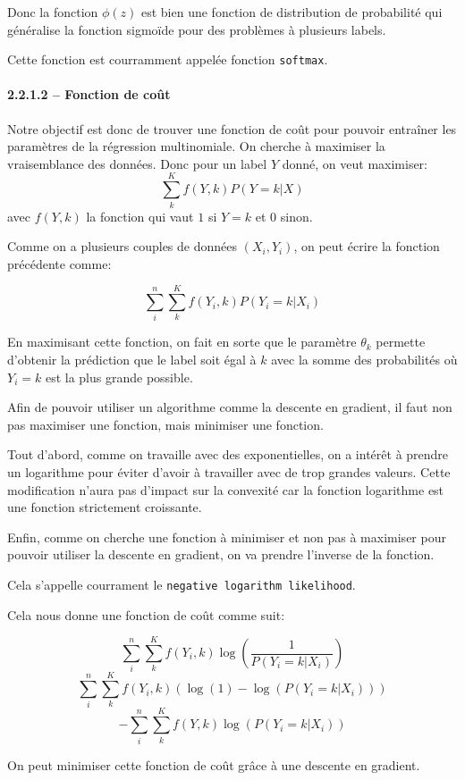 \documentclass[
]{article}
\begin{document}
Donc la fonction \(\phi(z)\) est bien une fonction de distribution de
probabilité qui généralise la fonction sigmoïde pour des problèmes à
plusieurs labels.

Cette fonction est courramment appelée fonction \texttt{softmax}.

\paragraph{2.2.1.2 -- Fonction de coût}\label{fonction-de-couxfbt}

Notre objectif est donc de trouver une fonction de coût pour pouvoir
entraîner les paramètres de la régression multinomiale. On cherche à
maximiser la vraisemblance des données. Donc pour un label \(Y\) donné,
on veut maximiser: \[\sum_k^K f(Y, k) P(Y = k | X)\] avec \(f(Y, k)\) la
fonction qui vaut \(1\) si \(Y = k\) et \(0\) sinon.

Comme on a plusieurs couples de données \((X_i, Y_i)\), on peut écrire
la fonction précédente comme:

\[\sum_i^n\sum_k^K f(Y_i, k) P(Y_i = k | X_i)\]

En maximisant cette fonction, on fait en sorte que le paramètre
\(\theta_k\) permette d'obtenir la prédiction que le label soit égal à
\(k\) avec la somme des probabilités où \(Y_i = k\) est la plus grande
possible.

Afin de pouvoir utiliser un algorithme comme la descente en gradient, il
faut non pas maximiser une fonction, mais minimiser une fonction.

Tout d'abord, comme on travaille avec des exponentielles, on a intérêt à
prendre un logarithme pour éviter d'avoir à travailler avec de trop
grandes valeurs. Cette modification n'aura pas d'impact sur la convexité
car la fonction logarithme est une fonction strictement croissante.

Enfin, comme on cherche une fonction à minimiser et non pas à maximiser
pour pouvoir utiliser la descente en gradient, on va prendre l'inverse
de la fonction.

Cela s'appelle courrament le \texttt{negative\ logarithm\ likelihood}.

Cela nous donne une fonction de coût comme suit:

\[\sum_i^n \sum_k^K f(Y_i, k) \log(\frac{1}{P(Y_i = k | X_i)})\]
\[\sum_i^n \sum_k^K f(Y_i, k) (\log(1) - \log(P(Y_i = k | X_i)))\]
\[-\sum_i^n \sum_k^K f(Y, k)\log(P(Y_i = k | X_i))\]

On peut minimiser cette fonction de coût grâce à une descente en
gradient.
\end{document}
